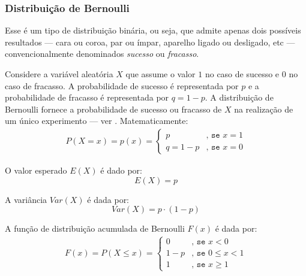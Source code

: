 \subsubsection{Distribuição de Bernoulli}
Esse é um tipo de distribuição binária, ou seja, que admite apenas dois
possíveis resultados --- cara ou coroa, par ou ímpar, aparelho ligado ou
desligado, etc --- convencionalmente denominados \emph{sucesso} ou
\emph{fracasso}.

Considere a variável aleatória $X$ que assume o valor $1$ no caso de sucesso e
$0$ no caso de fracasso. A probabilidade de sucesso é representada por $p$ e a
probabilidade de fracasso é representada por $q = 1 - p$. A distribuição de
Bernoulli fornece a probabilidade de sucesso ou fracasso de $X$ na realização
de um único experimento --- ver . Matematicamente:
\begin{equation}
    \begin{split}
    P(X = x) = p(x) =
    \begin{cases}
        p & \texttt{, se } x = 1 \\
        q = 1-p & \texttt{, se } x = 0
    \end{cases}
    \end{split}
    \label{eq:dist-bernoulli}
\end{equation}

O valor esperado $E(X)$ é dado por:
\begin{equation}
    E(X) = p
\end{equation}

A variância $Var(X)$ é dada por:
\begin{equation}
    Var(X) = p \cdot (1-p)
\end{equation}

A função de distribuição acumulada de Bernoulli $F(x)$ é dada por:
\begin{equation}
    \begin{split}
    F(x) = P(X \leq x) =
    \begin{cases}
        0 & \texttt{, se } x < 0 \\
        1-p & \texttt{, se } 0 \leq x < 1 \\
        1 & \texttt{, se } x \geq 1
    \end{cases}
    \end{split}
    \label{eq:dist-bernoulli-acumulada}
\end{equation}

